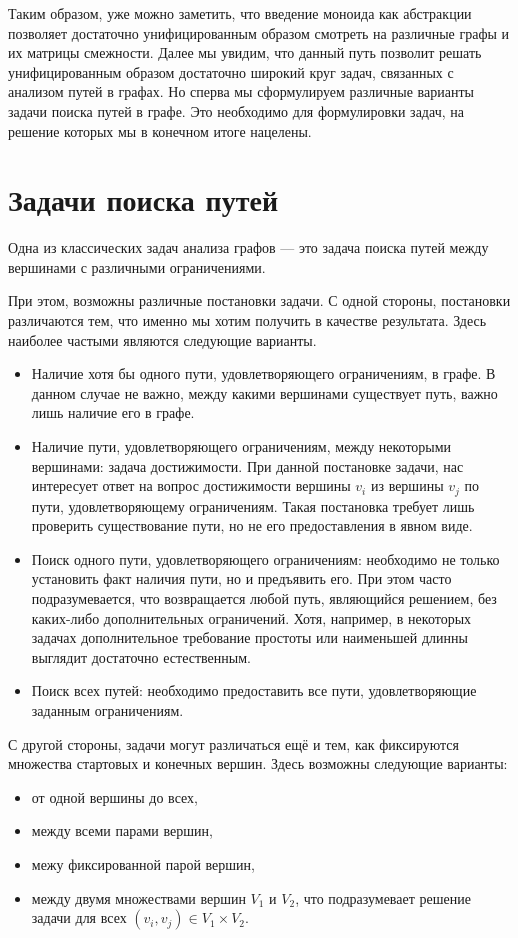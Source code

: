 Таким образом, уже можно заметить, что введение моноида как абстракции позволяет достаточно унифицированным образом смотреть на различные графы и их матрицы смежности. Далее мы увидим, что данный путь позволит решать унифицированным образом достаточно широкий круг задач, связанных с анализом путей в графах. Но сперва мы сформулируем различные варианты задачи поиска путей в графе. Это необходимо для формулировки задач, на решение которых мы в конечном итоге нацелены. 

\section{Задачи поиска путей}

Одна из классических задач анализа графов --- это задача поиска путей между вершинами с различными ограничениями.

При этом, возможны различные постановки задачи.
С одной стороны, постановки различаются тем, что именно мы хотим получить в качестве результата. Здесь наиболее частыми являются следующие варианты.

\begin{itemize}
\item Наличие хотя бы одного пути, удовлетворяющего ограничениям, в графе. В данном случае не важно, между какими вершинами существует путь, важно лишь наличие его в графе.

\item Наличие пути, удовлетворяющего ограничениям, между некоторыми вершинами: задача достижимости.
      При данной постановке задачи, нас интересует ответ на вопрос достижимости вершины $v_i$ из вершины $v_j$ по пути, удовлетворяющему ограничениям.
      Такая постановка требует лишь проверить существование пути, но не его предоставления в явном виде.

\item Поиск одного пути, удовлетворяющего ограничениям: необходимо не только установить факт наличия пути, но и  предъявить его. При этом часто подразумевается, что возвращается любой путь, являющийся решением, без каких-либо дополнительных ограничений. Хотя, например, в некоторых задачах дополнительное требование простоты или наименьшей длинны выглядит достаточно естественным.

\item Поиск всех путей: необходимо предоставить все пути, удовлетворяющие заданным ограничениям.
\end{itemize}

С другой стороны, задачи могут различаться ещё и тем, как фиксируются множества стартовых и конечных вершин.
Здесь возможны следующие варианты:
\begin{itemize}
\item от одной вершины до всех,
\item между всеми парами вершин,
\item межу фиксированной парой вершин,
\item между двумя множествами вершин $V_1$ и $V_2$, что подразумевает решение задачи для всех $(v_i,v_j) \in V_1 \times V_2$.
\end{itemize}

